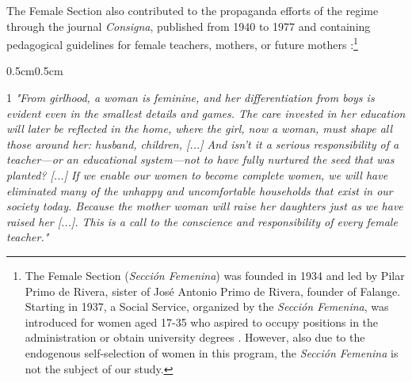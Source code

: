\documentclass[a4paper,oneside,final,onecolumn,12pt,english]{article}
\begin{document}
The Female Section also contributed to the propaganda efforts of the regime through the journal \textit{Consigna}, published from 1940 to 1977 and containing pedagogical guidelines for female teachers, mothers, or future mothers  \citep[][p. 49--50]{rabazas2006construccion}:\footnote{The Female Section (\textit{Secci\'on Femenina}) was founded in 1934 and led by Pilar Primo de Rivera, sister of Jos\'e Antonio Primo de Rivera, founder of Falange. Starting in 1937, a Social Service, organized by the \textit{Secci\'on Femenina}, was introduced for women aged 17-35 who aspired to occupy positions in the administration or obtain university degrees \citep[][]{rd_serviciosocial}. However, also due to the endogenous self-selection of women in this program, the \textit{Secci\'on Femenina} is not the subject of our study.} 
\begin{adjustwidth}{0.5cm}{0.5cm} 
\begin{spacing}{1}
 \textit{"From girlhood, a woman is feminine, and her differentiation from boys is evident even in the smallest details and games. The care invested in her education will later be reflected in the home, where the girl, now a woman, must shape all those around her: husband, children, [...] And isn’t it a serious responsibility of a teacher—or an educational system—not to have fully nurtured the seed that was planted? [...] If we enable our women to become complete women, we will have eliminated many of the unhappy and uncomfortable households that exist in our society today. Because the mother woman will raise her daughters just as we have raised her [...]. This is a call to the conscience and responsibility of every female teacher." \citep[][p. 30--32]{consigna_1958mujer}} %
\end{spacing}
\end{adjustwidth}
\vspace{-0.5cm}
\end{document}
